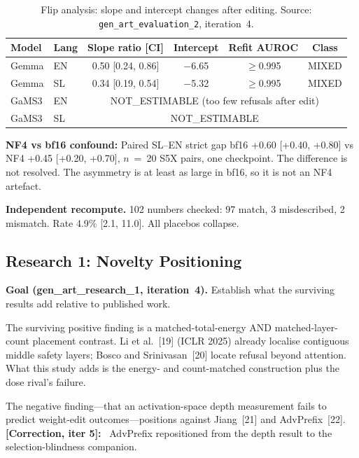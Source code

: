 \documentclass[11pt,letterpaper]{article}
\newcommand{\corr}[1]{\noindent\textbf{[Correction, iter #1]:}~}
\begin{document}
\begin{table}[!htbp]
\centering
\caption{Flip analysis: slope and intercept changes after editing. Source: \texttt{gen\_art\_evaluation\_2}, iteration~4.}
\label{tab:eval2_flip}
\small
\begin{tabular}{llcccc}
\toprule
Model & Lang & Slope ratio [CI] & Intercept & Refit AUROC & Class \\
\midrule
Gemma & EN & 0.50 [0.24, 0.86] & $-$6.65 & $\geq$0.995 & MIXED \\
Gemma & SL & 0.34 [0.19, 0.54] & $-$5.32 & $\geq$0.995 & MIXED \\
GaMS3 & EN & \multicolumn{4}{c}{NOT\_ESTIMABLE (too few refusals after edit)} \\
GaMS3 & SL & \multicolumn{4}{c}{NOT\_ESTIMABLE} \\
\bottomrule
\end{tabular}
\end{table}

\textbf{NF4 vs bf16 confound:} Paired SL--EN strict gap bf16 +0.60 [+0.40, +0.80] vs NF4 +0.45 [+0.20, +0.70], $n$~=~20 S5X pairs, one checkpoint. The difference is not resolved. The asymmetry is at least as large in bf16, so it is not an NF4 artefact.

\textbf{Independent recompute.} 102 numbers checked: 97 match, 3 misdescribed, 2 mismatch. Rate 4.9\% [2.1, 11.0]. All placebos collapse.


\subsection{Research 1: Novelty Positioning}\label{sec:research1}

\textbf{Goal (gen\_art\_research\_1, iteration~4).} Establish what the surviving results add relative to published work.

The surviving positive finding is a matched-total-energy AND matched-layer-count placement contrast. Li et al.~[19] (ICLR 2025) already localise contiguous middle safety layers; Bosco and Srinivasan~[20] locate refusal beyond attention. What this study adds is the energy- and count-matched construction plus the dose rival's failure.

The negative finding---that an activation-space depth measurement fails to predict weight-edit outcomes---positions against Jiang~[21] and AdvPrefix~[22]. \corr{5} AdvPrefix repositioned from the depth result to the selection-blindness companion.


\end{document}
